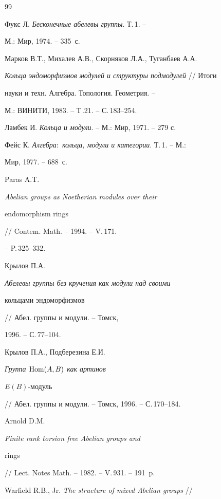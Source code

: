 \begin{thebibliography}{99} 


 




Фукс Л. {\em Бесконечные абелевы группы}. Т.\,1. -- 


М.: Мир, 1974. -- 335~с. 




Марков В.Т., Михалев А.В., Скорняков Л.А., Туганбаев А.А. 


{\em Кольца эндоморфизмов модулей и структуры подмодулей} // Итоги 


науки и техн. Алгебра. Топология. Геометрия. -- 


М.: ВИНИТИ, 1983. -- Т\,.21. -- С.\,183--254. 




Ламбек И. {\em Кольца и модули}. -- М.: Мир, 1971. -- 279 с. 




Фейс К. {\em Алгебра$:$ кольца, модули и категории}. Т.\,1. -- М.: 


Мир, 1977. -- 688~с. 




Paras A.T. {\em Abelian groups as Noetherian modules over their 


endomorphism rings} // Contem. Math. -- 1994. -- V.\,171. 


-- P.\,325--332. 




Крылов П.А. {\em Абелевы группы без кручения как модули над своими 


кольцами эндоморфизмов} // Абел. группы и модули. -- Томск, 


1996. -- С.\,77--104. 




Крылов П.А., Подберезина Е.И. {\em Группа $\operatorname{Hom}(A,B)$ как артинов 


$E(B)$-модуль} // Абел. группы и модули. -- Томск, 1996. -- С.\,170--184. 




Arnold D.M. {\em Finite rank torsion free Abelian groups and 


rings} // Lect. Notes Math. -- 1982. -- V.\,931. -- 191~p. 




Warfield R.B., Jr. {\em The structure of mixed Abelian groups} // 



\end{thebibliography}

